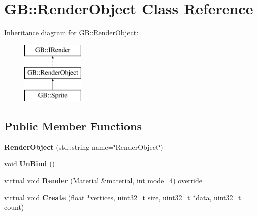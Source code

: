 \hypertarget{class_g_b_1_1_render_object}{}\section{GB\+::Render\+Object Class Reference}
\label{class_g_b_1_1_render_object}
Inheritance diagram for GB\+::Render\+Object\+:\begin{figure}[H]
\begin{center}
\leavevmode
\includegraphics[height=3.000000cm]{class_g_b_1_1_render_object}
\end{center}
\end{figure}
\subsection*{Public Member Functions}
\begin{DoxyCompactItemize}
\item 
\mbox{\label{class_g_b_1_1_render_object_ae3d374b4c6c9abbb1e801b0ada7d3354}} 
{\bfseries Render\+Object} (std\+::string name=\char`\"{}Render\+Object\char`\"{})
\item 
\mbox{\label{class_g_b_1_1_render_object_a2d9d35035644972ee71bbc77165e35a6}} 
void {\bfseries Un\+Bind} ()
\item 
\mbox{\label{class_g_b_1_1_render_object_ae1ec1e6bcf6b056cbed0816c969a572e}} 
virtual void {\bfseries Render} (\mbox{\hyperlink{class_g_b_1_1_material}{Material}} \&material, int mode=4) override
\item 
\mbox{\label{class_g_b_1_1_render_object_a54da3838dd3a8fc1b4226366336ece4f}} 
virtual void {\bfseries Create} (float $\ast$vertices, uint32\+\_\+t size, uint32\+\_\+t $\ast$data, uint32\+\_\+t count)
\end{DoxyCompactItemize}
